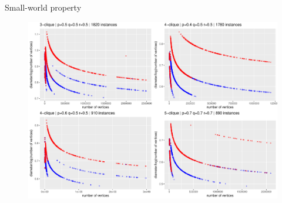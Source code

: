 \begin{block}{Small-world property}
\begin{figure}
\includegraphics[width=0.8\linewidth]{./fig/klikkdiam4.pdf}
\end{figure}
\end{block}
